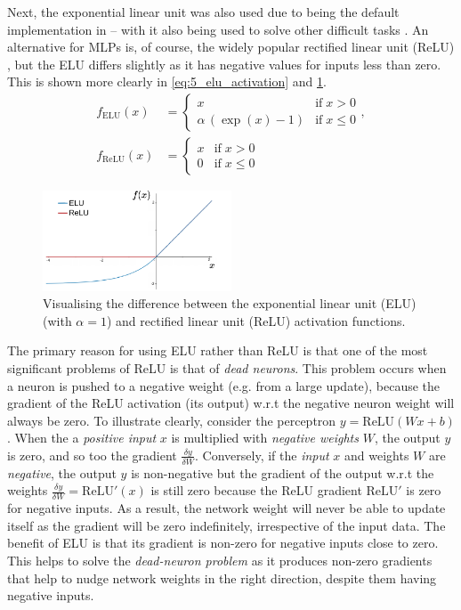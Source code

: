 Next, the exponential linear unit \cite{ELU} was also used due to being the default implementation in \cite{IsaacGym} -- with it also being used to solve other difficult tasks \cite{shadowHand, LearningWalkMassivelyParallel}. An alternative for MLPs is, of course, the widely popular rectified linear unit (ReLU) \cite{ReLU}, but the ELU differs slightly as it has negative values for inputs less than zero. This is shown more clearly in \eqref{eq:5_elu_activation} and \cref{fig:5_relu_elu}.
\begin{align}
        f_\text{ELU}(x) &= \begin{cases}
          x & \text{if} \; x > 0 \\
          \alpha \, (\exp{(x)} - 1) & \text{if} \; x \leq 0
        \end{cases}, \label{eq:5_elu_activation} \\
        f_\text{ReLU}(x) &= \begin{cases}
          x & \text{if} \; x > 0 \\
          0 & \text{if} \; x \leq 0
        \end{cases} \label{eq:5_relu_activation}
\end{align}
\begin{figure}[hbt]
    \centering
    \includegraphics[width=0.5\textwidth]{figures/5_/5_relu_elu.pdf}
    \caption{Visualising the difference between the exponential linear unit (ELU) (with $\alpha = 1$) and rectified linear unit (ReLU) activation functions.}
    \label{fig:5_relu_elu}
\end{figure}

The primary reason for using ELU rather than ReLU is that one of the most significant problems of ReLU is that of \textit{dead neurons}. This problem occurs when a neuron is pushed to a negative weight (e.g. from a large update), because the gradient of the ReLU activation (its output) w.r.t the negative neuron weight will always be zero. To illustrate clearly, consider the perceptron $y = \text{ReLU}(Wx + b)$. When the a \textit{positive input} $x$ is multiplied with \textit{negative weights} $W$, the output $y$ is zero, and so too the gradient $\frac{\delta y}{\delta W}$. 
Conversely, if the \textit{input} $x$ and weights $W$ are \textit{negative}, the output $y$ is non-negative but the gradient of the output w.r.t the weights $\frac{\delta y}{\delta W} = \text{ReLU}' (x)$ is still zero because the ReLU gradient $\text{ReLU}'$ is zero for negative inputs.
As a result, the network weight will never be able to update itself as the gradient will be zero indefinitely, irrespective of the input data.
The benefit of ELU is that its gradient is non-zero for negative inputs close to zero. This helps to solve the \textit{dead-neuron problem} as it produces non-zero gradients that help to nudge network weights in the right direction, despite them having negative inputs. 


